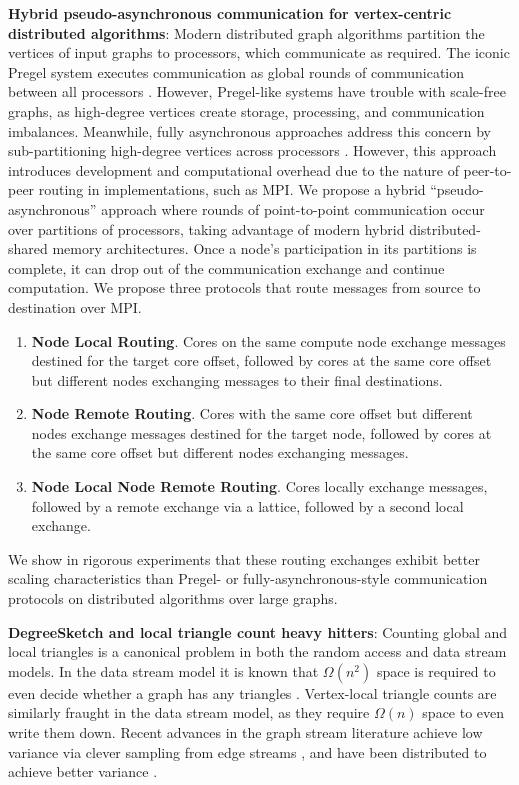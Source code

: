 \documentclass{report}
\begin{document}
\noindent
\textbf{Hybrid pseudo-asynchronous communication for vertex-centric distributed algorithms}:
Modern distributed graph algorithms partition the vertices of input graphs to processors, which communicate as required.
The iconic Pregel system executes communication as global rounds of communication between all processors \cite{malewicz2010pregel}.
However, Pregel-like systems have trouble with scale-free graphs, as high-degree vertices create storage, processing, and communication imbalances.
Meanwhile, fully asynchronous approaches address this concern by sub-partitioning high-degree vertices across processors \cite{pearce2014faster}.
However, this approach introduces development and computational overhead due to the nature of peer-to-peer routing in implementations, such as MPI.
We propose a hybrid ``pseudo-asynchronous'' approach where rounds of point-to-point communication occur over partitions of processors, taking advantage of modern hybrid distributed-shared memory architectures.
Once a node's participation in its partitions is complete, it can drop out of the communication exchange and continue computation.
We propose three protocols that route messages from source to destination over MPI. 
%
\begin{enumerate}
	\item \textbf{Node Local Routing}. Cores on the same compute node exchange messages destined for the target core offset, followed by cores at the same core offset but different nodes exchanging messages to their final destinations.
	\item \textbf{Node Remote Routing}. Cores with the same core offset but different nodes exchange messages destined for the target node, followed by cores at the same core offset but different nodes exchanging messages.
	\item \textbf{Node Local Node Remote Routing}. Cores locally exchange messages, followed by a remote exchange via a lattice, followed by a second local exchange. 
\end{enumerate}
%
We show in rigorous experiments that these routing exchanges exhibit better scaling characteristics than Pregel- or fully-asynchronous-style communication protocols on distributed algorithms over large graphs.

\noindent
\textbf{DegreeSketch and local triangle count heavy hitters}:
Counting global and local triangles is a canonical problem in both the random access and data stream models. 
In the data stream model it is known that $\Omega(n^2)$ space is required to even decide whether a graph has any triangles \cite{bar2002reductions}.
Vertex-local triangle counts are similarly fraught in the data stream model, as they require $\Omega(n)$ space to even write them down. 
Recent advances in the graph stream literature achieve low variance via clever sampling from edge streams \cite{becchetti2008efficient, lim2015mascot, stefani2017triest}, and have been distributed to achieve better variance \cite{shin2018tri, shin2018dislr}.
\end{document}

